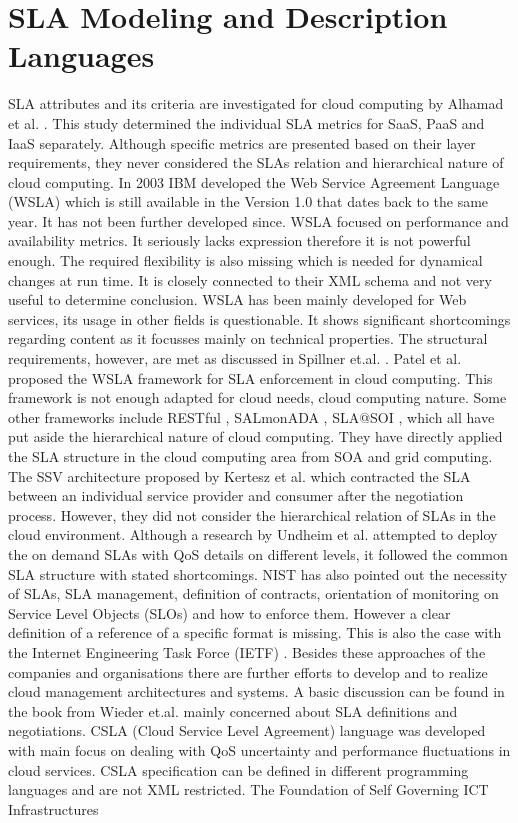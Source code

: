 \section{SLA Modeling and Description Languages}
SLA attributes and its criteria are investigated for cloud computing by Alhamad et al. \cite{5610586}. This study determined the individual SLA metrics for SaaS, PaaS and IaaS separately. Although specific metrics are presented based on their layer requirements, they never considered the SLAs relation and hierarchical nature of cloud computing. In 2003 IBM developed the Web Service Agreement Language (WSLA) \cite{Ludwig03WSLA} which is still available in the Version 1.0 that dates back to the same year. It has not been further developed since. WSLA focused on performance and availability metrics. It seriously lacks expression therefore it is not powerful enough. The required flexibility is also missing which is needed for dynamical changes at run time. It is closely connected to their XML schema and not very useful to determine conclusion. WSLA has been mainly developed for Web services, its usage in other fields is questionable. It shows significant shortcomings regarding content as it focusses mainly on technical properties. The structural requirements, however, are met as discussed in Spillner et.al. \cite{Spillner2009}. Patel et al. \cite{Patel2009ServiceLA} proposed the WSLA framework for SLA enforcement in cloud computing. This framework is not enough adapted for cloud needs, cloud computing nature. Some other frameworks include RESTful \cite{Kubert:2011:RIW:1967428.1967444}, SALmonADA \cite{6225938}, SLA@SOI \cite{slasoi2011}, which all have put aside the hierarchical nature of cloud computing. They have directly applied the SLA structure in the cloud computing area from SOA and grid computing. The SSV architecture proposed by Kertesz et al. \cite{5739040} which contracted the SLA between an individual service provider and consumer after the negotiation process. However, they did not consider the hierarchical relation of SLAs in the cloud environment. Although a research by Undheim et al. \cite{6076508} attempted to deploy the on demand SLAs with QoS details on different levels, it followed the common SLA structure with stated shortcomings. NIST \cite{Liu2011} has also pointed out the necessity of SLAs, SLA management, definition of contracts, orientation of monitoring on Service Level Objects (SLOs) and how to enforce them. However a clear definition of a reference of a specific format is missing. This is also the case with the Internet Engineering Task Force (IETF) \cite{Khasnabish2010}. Besides these approaches of the companies and organisations there are further efforts to develop and to realize cloud management architectures and systems. A basic discussion can be found in the book from Wieder et.al. \cite{Wieder2011} mainly concerned about SLA definitions and negotiations. CSLA \cite{kouki2014language} (Cloud Service Level Agreement) language was developed with main focus on dealing with QoS uncertainty and performance fluctuations in cloud services. CSLA specification can be defined in different programming languages and are not XML restricted. The Foundation of Self Governing ICT Infrastructures 